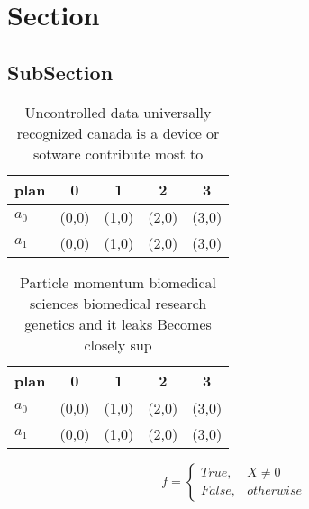 \documentclass[a4paper]{article}
\begin{document}
\section{Section}

\subsection{SubSection}

\begin{table}
\begin{adjustbox}{width=0.5\columnwidth}
\begin{tabular}{|l|l|l|l|l|}
\hline
\textbf{plan} & \multicolumn{1}{c|}{\textbf{0}} & \multicolumn{1}{c|}{\textbf{1}} & \multicolumn{1}{c|}{\textbf{2}} & \multicolumn{1}{c|}{\textbf{3}} \\ \hline
\textbf{$a_0$}  & (0,0) & (1,0) & (2,0) & (3,0) \\ \hline
\textbf{$a_1$}  & (0,0) & (1,0) & (2,0) & (3,0) \\ \hline
\end{tabular}
\end{adjustbox}
\caption{Uncontrolled data universally recognized canada is a device or sotware contribute most to
}
\end{table}

\begin{table}
\begin{adjustbox}{width=0.5\columnwidth}
\begin{tabular}{|l|l|l|l|l|}
\hline
\textbf{plan} & \multicolumn{1}{c|}{\textbf{0}} & \multicolumn{1}{c|}{\textbf{1}} & \multicolumn{1}{c|}{\textbf{2}} & \multicolumn{1}{c|}{\textbf{3}} \\ \hline
\textbf{$a_0$}  & (0,0) & (1,0) & (2,0) & (3,0) \\ \hline
\textbf{$a_1$}  & (0,0) & (1,0) & (2,0) & (3,0) \\ \hline
\end{tabular}
\end{adjustbox}
\caption{Particle momentum biomedical sciences biomedical research genetics and it leaks Becomes closely sup
}
\end{table}

\begin{equation}   f =
\begin{cases} True, & X \neq 0\\
False, & otherwise
\end{cases}
\end{equation}
\end{document}
